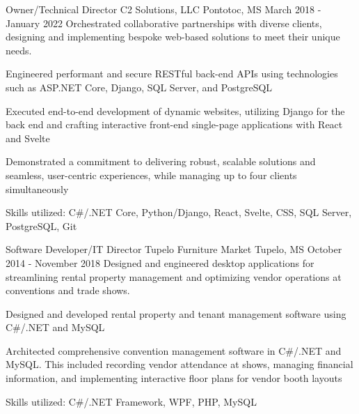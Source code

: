 \begin{cventries}
  \cventry
    {Owner/Technical Director} %
    {C2 Solutions, LLC} %
    {Pontotoc, MS} %
    {March 2018 - January 2022} %
    {Orchestrated collaborative partnerships with diverse clients, designing and implementing bespoke web-based solutions to meet their unique needs.}
    {
      \begin{cvitems}
        \item {Engineered performant and secure RESTful back-end APIs using technologies such as ASP.NET Core, Django, SQL Server, and PostgreSQL}
        \item {Executed end-to-end development of dynamic websites, utilizing Django for the back end and crafting interactive front-end single-page applications with React and Svelte}
        \item {Demonstrated a commitment to delivering robust, scalable solutions and seamless, user-centric experiences, while managing up to four clients simultaneously} 
        \item {Skills utilized: C\#/.NET Core, Python/Django, React, Svelte, CSS, SQL Server, PostgreSQL, Git}
      \end{cvitems}
    }

  \cventry
    {Software Developer/IT Director} %
    {Tupelo Furniture Market} %
    {Tupelo, MS} %
    {October 2014 - November 2018} %
    {Designed and engineered desktop applications for streamlining rental property management and optimizing vendor operations at conventions and trade shows.}
    {
      \begin{cvitems}
        \item {Designed and developed rental property and tenant management software using C\#/.NET and MySQL}
        \item {Architected comprehensive convention management software in C\#/.NET and MySQL. This included recording vendor attendance at shows, managing financial information, and implementing interactive floor plans for vendor booth layouts}
        \item {Skills utilized: C\#/.NET Framework, WPF, PHP, MySQL}
      \end{cvitems}
    }

\end{cventries}
